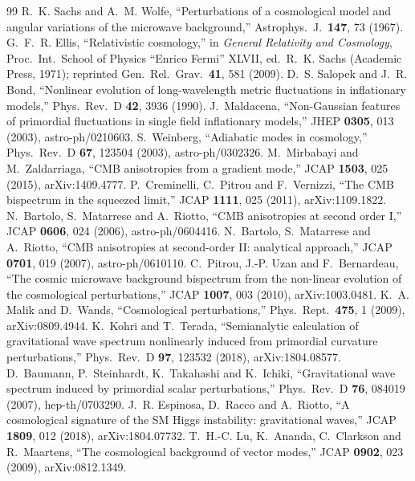 \begin{thebibliography}{99}
 R.~K. Sachs and A.~M. Wolfe, ``Perturbations of a cosmological model and angular variations of the microwave background,'' Astrophys.\ J.\ {\bf 147}, 73 (1967).
 G.~F.~R. Ellis, ``Relativistic cosmology,'' in \emph{General Relativity and Cosmology}, Proc.\ Int.\ School of Physics ``Enrico Fermi'' XLVII, ed.\ R.~K. Sachs (Academic Press, 1971); reprinted Gen.\ Rel.\ Grav.\ {\bf 41}, 581 (2009).
 D.~S. Salopek and J.~R. Bond, ``Nonlinear evolution of long-wavelength metric fluctuations in inflationary models,'' Phys.\ Rev.\ D {\bf 42}, 3936 (1990).
 J.~Maldacena, ``Non-Gaussian features of primordial fluctuations in single field inflationary models,'' JHEP {\bf 0305}, 013 (2003), astro-ph/0210603.
 S.~Weinberg, ``Adiabatic modes in cosmology,'' Phys.\ Rev.\ D {\bf 67}, 123504 (2003), astro-ph/0302326.
 M.~Mirbabayi and M.~Zaldarriaga, ``CMB anisotropies from a gradient mode,'' JCAP {\bf 1503}, 025 (2015), arXiv:1409.4777.
 P.~Creminelli, C.~Pitrou and F.~Vernizzi, ``The CMB bispectrum in the squeezed limit,'' JCAP {\bf 1111}, 025 (2011), arXiv:1109.1822.
 N.~Bartolo, S.~Matarrese and A.~Riotto, ``CMB anisotropies at second order I,'' JCAP {\bf 0606}, 024 (2006), astro-ph/0604416.
 N.~Bartolo, S.~Matarrese and A.~Riotto, ``CMB anisotropies at second-order II: analytical approach,'' JCAP {\bf 0701}, 019 (2007), astro-ph/0610110.
 C.~Pitrou, J.-P. Uzan and F.~Bernardeau, ``The cosmic microwave background bispectrum from the non-linear evolution of the cosmological perturbations,'' JCAP {\bf 1007}, 003 (2010), arXiv:1003.0481.
 K.~A. Malik and D.~Wands, ``Cosmological perturbations,'' Phys.\ Rept.\ {\bf 475}, 1 (2009), arXiv:0809.4944.
 K.~Kohri and T.~Terada, ``Semianalytic calculation of gravitational wave spectrum nonlinearly induced from primordial curvature perturbations,'' Phys.\ Rev.\ D {\bf 97}, 123532 (2018), arXiv:1804.08577.
 D.~Baumann, P.~Steinhardt, K.~Takahashi and K.~Ichiki, ``Gravitational wave spectrum induced by primordial scalar perturbations,'' Phys.\ Rev.\ D {\bf 76}, 084019 (2007), hep-th/0703290.
 J.~R. Espinosa, D.~Racco and A.~Riotto, ``A cosmological signature of the SM Higgs instability: gravitational waves,'' JCAP {\bf 1809}, 012 (2018), arXiv:1804.07732.
 T.~H.-C. Lu, K.~Ananda, C.~Clarkson and R.~Maartens, ``The cosmological background of vector modes,'' JCAP {\bf 0902}, 023 (2009), arXiv:0812.1349.

\end{thebibliography}
